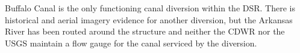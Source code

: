 Buffalo Canal is the only functioning canal diversion within the DSR.  There is historical and aerial imagery evidence for another diversion, but the Arkansas River has been routed around the structure and neither the CDWR nor the USGS maintain a flow gauge for the canal serviced by the diversion.

\clearpage{}
